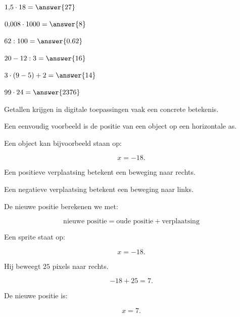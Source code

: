 \documentclass{ximera}
\begin{document}
\begin{oefening}[Rekenroutine B]{\oefB}
\begin{question} \(1{,}5\cdot18=\answer{27}\) \end{question}

\begin{question} \(0{,}008\cdot1000=\answer{8}\) \end{question}

\begin{question} \(62:100=\answer{0.62}\) \end{question}

\begin{question} \(20-12:3=\answer{16}\) \end{question}

\begin{question} \(3\cdot(9-5)+2=\answer{14}\) \end{question}

\begin{question} \(99\cdot24=\answer{2376}\) \end{question}

\end{oefening}




Getallen krijgen in digitale toepassingen vaak een concrete betekenis.

Een eenvoudig voorbeeld is de positie van een object op een horizontale as.

Een object kan bijvoorbeeld staan op:

\[
x=-18.
\]

Een positieve verplaatsing betekent een beweging naar rechts.

Een negatieve verplaatsing betekent een beweging naar links.

De nieuwe positie berekenen we met:

\[
\boxed{
\text{nieuwe positie}
=
\text{oude positie}
+
\text{verplaatsing}
}
\]


\begin{voorbeeld}

Een sprite staat op:

\[
x=-18.
\]

Hij beweegt \(25\) pixels naar rechts.

\[
-18+25=7.
\]

De nieuwe positie is:

\[
x=7.
\]

\end{voorbeeld}
\end{document}
